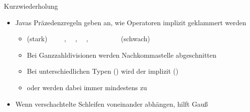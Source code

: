 {\begin{frame}[fragile,c]{Kurzwiederholung}
\begin{itemize}[<+(1)->]
\begin{itemize}
            \item {}~\k~~\k~~\k~~\k~~~und~~~\k~
        \end{itemize}
        \item Javas Präzedenzregeln geben an, wie Operatoren implizit geklammert werden \begin{itemize}
            \item \textcolor{codeouthl}{(stark)}~~~\T{\a++}~\K~\T{!\a}, \T{++\a}~\K~\T{\a\,/\,\b}, \T{\a\,*\,\b}~\K~\T{\a\,+\,\b}, \T{\a\,-\,\b}~\K~\T{\a\,==\,\b}~\K~\T{\a\,\&\&\,\b}~\K~\T{\a\,|\!|\,\b}~~~\textcolor{codeouthl}{(schwach)}%
            \item Bei Ganzzahldivisionen werden Nachkommastelle abgeschnitten 
            \item Bei unterschiedlichen Typen () wird der  implizit  ()
            \item {} oder  werden dabei immer mindestens zu  
        \end{itemize}
        \item Wenn verschachtelte Schleifen voneinander abhängen, hilft Gauß %
    \end{itemize}
\end{frame}

}
